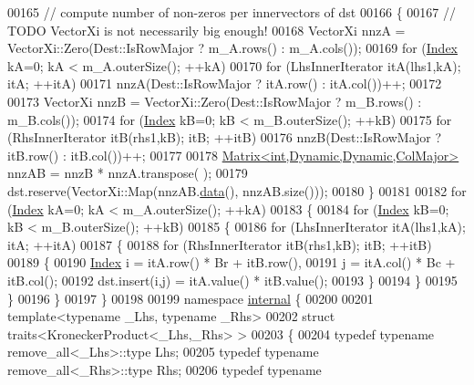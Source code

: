 \begin{DoxyCode}
00165   \textcolor{comment}{// compute number of non-zeros per innervectors of dst}
00166   \{
00167     \textcolor{comment}{// TODO VectorXi is not necessarily big enough!}
00168     VectorXi nnzA = VectorXi::Zero(Dest::IsRowMajor ? m\_A.rows() : m\_A.cols());
00169     \textcolor{keywordflow}{for} (\hyperlink{namespace_eigen_a62e77e0933482dafde8fe197d9a2cfde}{Index} kA=0; kA < m\_A.outerSize(); ++kA)
00170       \textcolor{keywordflow}{for} (LhsInnerIterator itA(lhs1,kA); itA; ++itA)
00171         nnzA(Dest::IsRowMajor ? itA.row() : itA.col())++;
00172       
00173     VectorXi nnzB = VectorXi::Zero(Dest::IsRowMajor ? m\_B.rows() : m\_B.cols());
00174     \textcolor{keywordflow}{for} (\hyperlink{namespace_eigen_a62e77e0933482dafde8fe197d9a2cfde}{Index} kB=0; kB < m\_B.outerSize(); ++kB)
00175       \textcolor{keywordflow}{for} (RhsInnerIterator itB(rhs1,kB); itB; ++itB)
00176         nnzB(Dest::IsRowMajor ? itB.row() : itB.col())++;
00177     
00178     \hyperlink{group___core___module_class_eigen_1_1_matrix}{Matrix<int,Dynamic,Dynamic,ColMajor>} nnzAB = nnzB * nnzA.transpose(
      );
00179     dst.reserve(VectorXi::Map(nnzAB.\hyperlink{class_eigen_1_1_plain_object_base_ac25699535374b1854cf8494e44ad31b2}{data}(), nnzAB.size()));
00180   \}
00181 
00182   \textcolor{keywordflow}{for} (\hyperlink{namespace_eigen_a62e77e0933482dafde8fe197d9a2cfde}{Index} kA=0; kA < m\_A.outerSize(); ++kA)
00183   \{
00184     \textcolor{keywordflow}{for} (\hyperlink{namespace_eigen_a62e77e0933482dafde8fe197d9a2cfde}{Index} kB=0; kB < m\_B.outerSize(); ++kB)
00185     \{
00186       \textcolor{keywordflow}{for} (LhsInnerIterator itA(lhs1,kA); itA; ++itA)
00187       \{
00188         \textcolor{keywordflow}{for} (RhsInnerIterator itB(rhs1,kB); itB; ++itB)
00189         \{
00190           \hyperlink{namespace_eigen_a62e77e0933482dafde8fe197d9a2cfde}{Index} i = itA.row() * Br + itB.row(),
00191                 j = itA.col() * Bc + itB.col();
00192           dst.insert(i,j) = itA.value() * itB.value();
00193         \}
00194       \}
00195     \}
00196   \}
00197 \}
00198 
00199 \textcolor{keyword}{namespace }\hyperlink{namespaceinternal}{internal} \{
00200 
00201 \textcolor{keyword}{template}<\textcolor{keyword}{typename} \_Lhs, \textcolor{keyword}{typename} \_Rhs>
00202 \textcolor{keyword}{struct }traits<KroneckerProduct<\_Lhs,\_Rhs> >
00203 \{
00204   \textcolor{keyword}{typedef} \textcolor{keyword}{typename} remove\_all<\_Lhs>::type Lhs;
00205   \textcolor{keyword}{typedef} \textcolor{keyword}{typename} remove\_all<\_Rhs>::type Rhs;
00206   \textcolor{keyword}{typedef} \textcolor{keyword}{typename} 

\end{DoxyCode}
